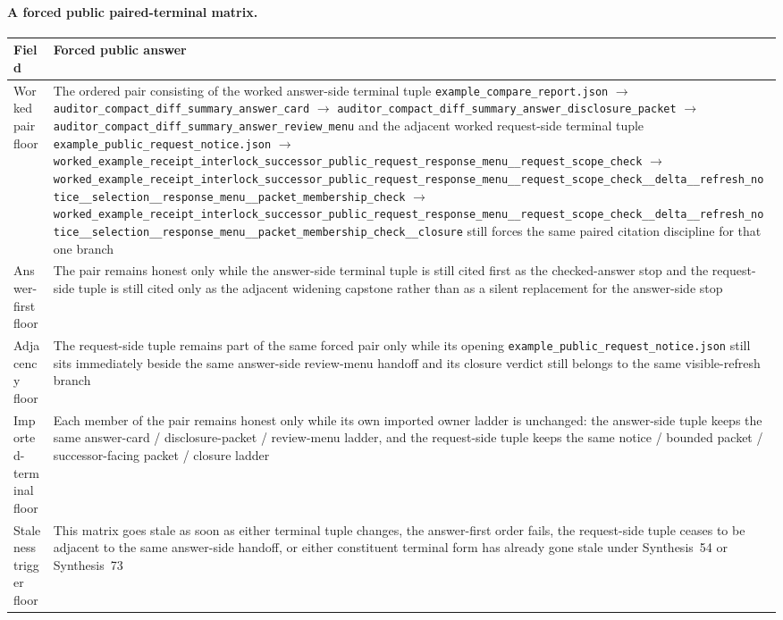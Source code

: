\documentclass[11pt]{article}
\begin{document}
\paragraph{A forced public paired-terminal matrix.}
\begin{table}[t]
\centering
\small
\begin{tabularx}{\linewidth}{@{}lX@{}}
\toprule
Field & Forced public answer \\
\midrule
Worked pair floor & The ordered pair consisting of the worked answer-side terminal tuple \nolinkurl{example_compare_report.json} $\to$ \nolinkurl{auditor_compact_diff_summary_answer_card} $\to$ \nolinkurl{auditor_compact_diff_summary_answer_disclosure_packet} $\to$ \nolinkurl{auditor_compact_diff_summary_answer_review_menu} and the adjacent worked request-side terminal tuple \nolinkurl{example_public_request_notice.json} $\to$ \nolinkurl{worked_example_receipt_interlock_successor_public_request_response_menu__request_scope_check} $\to$ \nolinkurl{worked_example_receipt_interlock_successor_public_request_response_menu__request_scope_check__delta__refresh_notice__selection__response_menu__packet_membership_check} $\to$ \nolinkurl{worked_example_receipt_interlock_successor_public_request_response_menu__request_scope_check__delta__refresh_notice__selection__response_menu__packet_membership_check__closure} still forces the same paired citation discipline for that one branch \\
Answer-first floor & The pair remains honest only while the answer-side terminal tuple is still cited first as the checked-answer stop and the request-side tuple is still cited only as the adjacent widening capstone rather than as a silent replacement for the answer-side stop \\
Adjacency floor & The request-side tuple remains part of the same forced pair only while its opening \nolinkurl{example_public_request_notice.json} still sits immediately beside the same answer-side review-menu handoff and its closure verdict still belongs to the same visible-refresh branch \\
Imported-terminal floor & Each member of the pair remains honest only while its own imported owner ladder is unchanged: the answer-side tuple keeps the same answer-card / disclosure-packet / review-menu ladder, and the request-side tuple keeps the same notice / bounded packet / successor-facing packet / closure ladder \\
Staleness trigger floor & This matrix goes stale as soon as either terminal tuple changes, the answer-first order fails, the request-side tuple ceases to be adjacent to the same answer-side handoff, or either constituent terminal form has already gone stale under Synthesis~54 or Synthesis~73 \\

\end{tabularx}
\end{table}
\end{document}
